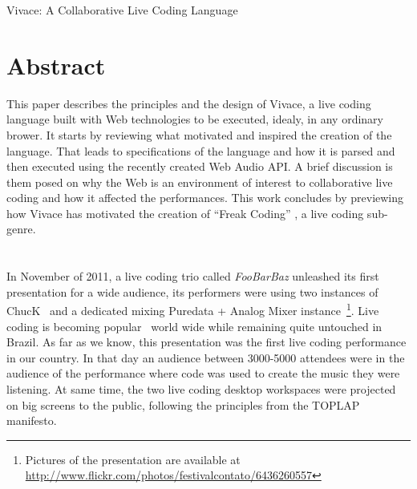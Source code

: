\documentclass[letterpaper, 12pt]{article}
\begin{document}

\vspace*{24pt}


 {\cmjTitle Vivace: A Collaborative Live Coding Language}


\section*{Abstract}

This paper describes the principles and the design of Vivace, a live
coding language built with Web technologies to be executed, idealy, in
any ordinary brower. It starts by reviewing what motivated and
inspired the creation of the language. That leads to specifications of
the language and how it is parsed and then executed using the recently
created Web Audio API. A brief discussion is them posed on why the Web
is an environment of interest to collaborative live coding and how it
affected the performances. This work concludes by previewing how
Vivace has motivated the creation of ``Freak Coding'' , a live coding
sub-genre.

\section*{} %

In November of 2011, a live coding trio called \textit{FooBarBaz}
unleashed its first presentation for a wide audience, its performers
were using two instances of ChucK~\citep*{wang2003chuck} and a
dedicated mixing Puredata + Analog Mixer instance~\footnote{Pictures
  of the presentation are available at
  \url{http://www.flickr.com/photos/festivalcontato/6436260557}}. Live
coding is becoming popular~\citep*{nilson2007live} world wide while
remaining quite untouched in Brazil. As far as we know, this
presentation was the first live coding performance in our country. In
that day an audience between 3000-5000 attendees were in the audience
of the performance where code was used to create the music they were
listening. At same time, the two live coding desktop workspaces were
projected on big screens to the public, following the principles from
the TOPLAP~\citep*{ward2004live} manifesto.
\end{document}
